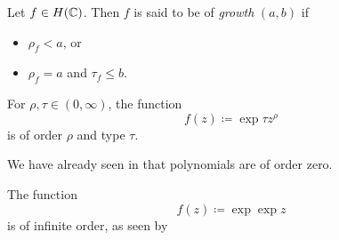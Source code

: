 



\begin{definition}
    Let $f \in H(\mathbb{C})$. Then $f$ is said to be of \emph{growth} $(a, b)$ if
    \begin{itemize}
        \item $\rho_f < a$, or
        \item $\rho_f = a$ and $\tau_f \leq b$.
    \end{itemize}
\end{definition}

\begin{example} \label{exm:order-and-type}
    For $\rho, \tau \in (0, \infty)$, the function
    $$ f(z) \coloneqq \exp {\tau z^\rho} $$
    is of order $\rho$ and type $\tau$.

    We have already seen in  that polynomials are of order zero.

    The function
    $$ f(z) \coloneqq \exp \exp z $$
    is of infinite order, as seen by 
\end{example}